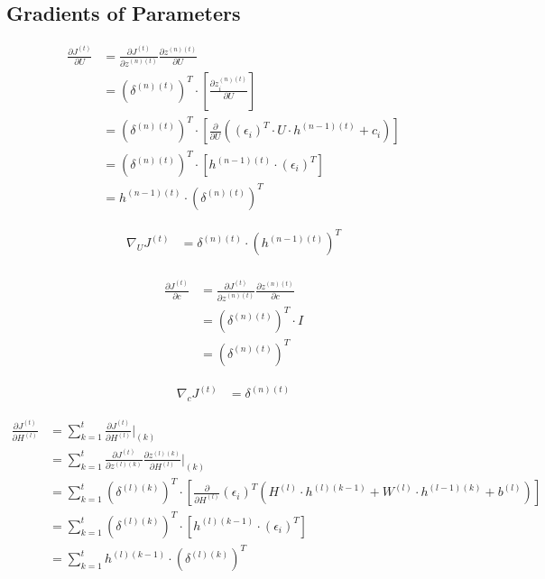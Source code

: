 \documentclass{article}
\begin{document}
	\subsection{Gradients of Parameters}
	\begin{equation}
	\begin{aligned}
		\frac{\partial J^{(t)}}{\partial U} 
		&= \frac{\partial J^{(t)}}{\partial z^{(n)(t)}} 
		\frac{\partial z^{(n)(t)}}{\partial U} \\
		&= (\delta^{(n)(t)})^T \cdot \left[\frac{\partial z^{(n)(t)}_i}{\partial U}\right]\\
		&= (\delta^{(n)(t)})^T \cdot \left[\frac{\partial }{\partial U} ((\epsilon_i)^T \cdot U \cdot h^{(n-1)(t)} + c_i)\right]\\
		&= (\delta^{(n)(t)})^T \cdot \left[h^{(n-1)(t)} \cdot (\epsilon_i)^T\right]\\	
		&= h^{(n-1)(t)} \cdot (\delta^{(n)(t)})^T
	\end{aligned}
	\end{equation}
	
	\begin{equation}
	\begin{aligned}
		\nabla_U J^{(t)} &= \delta^{(n)(t)} \cdot (h^{(n-1)(t)})^T\\
	\end{aligned}
	\end{equation}
	
	\begin{equation}
	\begin{aligned}
		\frac{\partial J^{(t)}}{\partial c} &= \frac{\partial J^{(t)}}{\partial z^{(n)(t)}} 
		\frac{\partial z^{(n)(t)}}{\partial c} \\
		&= (\delta^{(n)(t)})^T \cdot I \\
		&= (\delta^{(n)(t)})^T 
	\end{aligned}
	\end{equation}
	
	\begin{equation}
	\begin{aligned}
		\nabla_{c} J^{(t)} &= \delta^{(n)(t)} 
	\end{aligned}
	\end{equation}
	
	\begin{equation}
	\begin{aligned}
		\frac{\partial J^{(t)}}{\partial H^{(l)}} 
		&= \sum_{k=1}^{t} \frac{\partial J^{(t)}}{\partial H^{(l)}}\bigg|_{(k)}  \\
		&= \sum_{k=1}^{t}
		\frac{\partial J^{(t)}}{\partial z^{(l)(k)}} 
		\frac {\partial z^{(l)(k)}}{\partial H^{(l)}}\bigg|_{(k)} \\
		&= \sum_{k=1}^{t}
		(\delta^{(l)(k)})^T \cdot \left[\frac{\partial }{\partial H^{(l)}} (\epsilon_i)^T (H^{(l)} \cdot h^{(l)(k-1)} +  W^{(l)} \cdot h^{(l-1)(k)} + b^{(l)})\right] \\
		&= \sum_{k=1}^{t}
		(\delta^{(l)(k)})^T \cdot \left[h^{(l)(k-1)} \cdot (\epsilon_i)^T\right]\\	
		&= \sum_{k=1}^{t} h^{(l)(k-1)} \cdot (\delta^{(l)(k)})^T
	\end{aligned}
	\end{equation}
	
\end{document}
